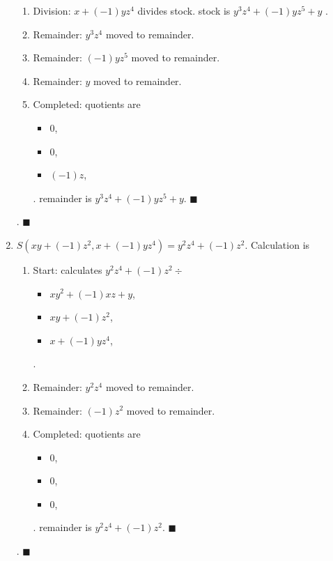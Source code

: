 \documentclass{jsarticle}
\begin{document}
\begin{enumerate}
\begin{enumerate}
\item Division: $x+(-1)yz^{4}$ divides stock. stock is $y^{3}z^{4}+(-1)yz^{5}+y$ .  
\item Remainder: $y^{3}z^{4}$ moved to remainder.  
\item Remainder: $(-1)yz^{5}$ moved to remainder.  
\item Remainder: $y$ moved to remainder.  
\item Completed: quotients are \begin{itemize}
\item $0$, 
\item $0$, 
\item $(-1)z$, 
\end{itemize} .  
remainder is $y^{3}z^{4}+(-1)yz^{5}+y$.  $\blacksquare$
\end{enumerate}
.  $\blacksquare{}$\item $S(xy+(-1)z^{2}, x+(-1)yz^{4}) = y^{2}z^{4}+(-1)z^{2}$.  Calculation is \begin{enumerate}
\item Start: calculates $y^{2}z^{4}+(-1)z^{2}\div $\begin{itemize}
\item $xy^{2}+(-1)xz+y$, 
\item $xy+(-1)z^{2}$, 
\item $x+(-1)yz^{4}$, 
\end{itemize} .  

\item Remainder: $y^{2}z^{4}$ moved to remainder.  
\item Remainder: $(-1)z^{2}$ moved to remainder.  
\item Completed: quotients are \begin{itemize}
\item $0$, 
\item $0$, 
\item $0$, 
\end{itemize} .  
remainder is $y^{2}z^{4}+(-1)z^{2}$.  $\blacksquare$
\end{enumerate}
.  $\blacksquare{}$\end{enumerate}
\end{document}
